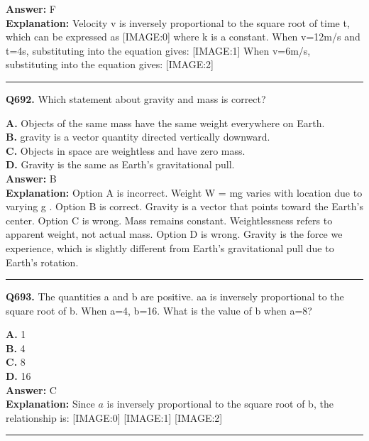 \documentclass[12pt]{article}
\begin{document}
\textbf{Answer:} F \\
\textbf{Explanation:} Velocity v is inversely proportional to the square root of time t, which can be expressed as
[IMAGE:0]
where k is a constant. When v=12m/s and t=4s, substituting into the equation gives:
[IMAGE:1]
When v=6m/s, substituting into the equation gives:
[IMAGE:2]

\hrule
\vspace{1em}


\noindent
\textbf{Q692.} Which statement about gravity and mass is correct?



\textbf{A.} Objects of the same mass have the same weight everywhere on Earth. \\
\textbf{B.} gravity
is a vector quantity directed vertically downward. \\
\textbf{C.} Objects in space are weightless and have zero mass. \\
\textbf{D.} Gravity is the same as Earth's gravitational pull. \\

\textbf{Answer:} B \\
\textbf{Explanation:} Option A is incorrect. Weight
W
=
mg
varies with location due to varying
g
.
Option B is correct.
Gravity
is a vector that points toward the Earth's center.
Option C is wrong. Mass remains constant. Weightlessness refers to apparent weight, not actual mass.
Option D is wrong. Gravity is the force we experience, which is slightly different from Earth's gravitational pull due to Earth's rotation.

\hrule
\vspace{1em}


\noindent
\textbf{Q693.} The quantities a and b are positive. aa is inversely proportional to the square root of b. When a=4, b=16. What is the value of b when a=8?



\textbf{A.} 1 \\
\textbf{B.} 4 \\
\textbf{C.} 8 \\
\textbf{D.} 16 \\

\textbf{Answer:} C \\
\textbf{Explanation:} Since
$𝑎$
is inversely proportional to the square root of b, the relationship is:
[IMAGE:0]
[IMAGE:1]
[IMAGE:2]

\hrule
\vspace{1em}
\end{document}
